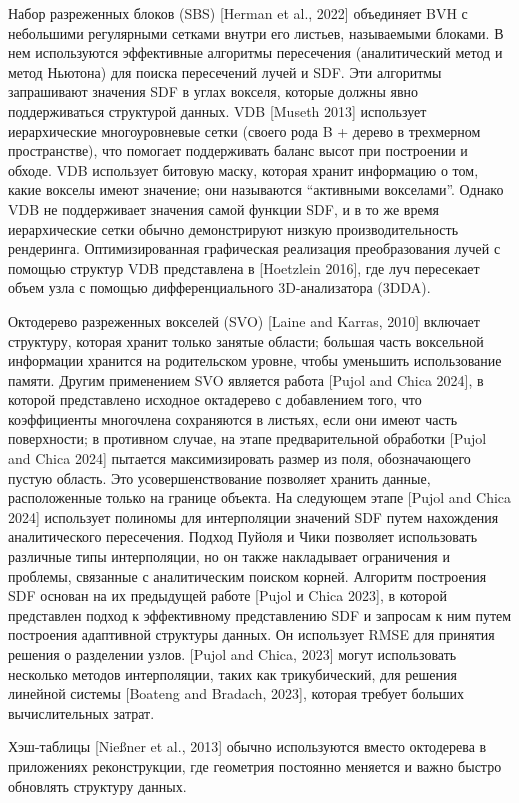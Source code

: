 \documentclass[a4paper,hidelinks,12pt]{article}
\begin{document}
Набор разреженных блоков (SBS) [Herman et al., 2022] объединяет BVH с небольшими регулярными сетками 
внутри его листьев, называемыми блоками. В нем используются эффективные алгоритмы пересечения 
(аналитический метод и метод Ньютона) для поиска пересечений лучей и SDF. Эти алгоритмы запрашивают значения SDF 
в углах вокселя, которые должны явно поддерживаться структурой данных. VDB [Museth 2013] использует иерархические 
многоуровневые сетки (своего рода B + дерево в трехмерном пространстве), что помогает поддерживать баланс высот при построении и 
обходе. VDB использует битовую маску, которая хранит информацию о том, какие вокселы имеют значение; они называются “активными вокселами”. 
Однако VDB не поддерживает значения самой функции SDF, и в то же время иерархические сетки обычно демонстрируют низкую 
производительность рендеринга. Оптимизированная графическая реализация преобразования лучей с помощью структур 
VDB представлена в [Hoetzlein 2016], где луч пересекает объем узла с помощью дифференциального 3D-анализатора (3DDA).

Октодерево разреженных вокселей (SVO) [Laine and Karras, 2010] включает структуру, которая хранит только 
занятые области; большая часть воксельной информации хранится на родительском уровне, чтобы уменьшить 
использование памяти. Другим применением SVO является работа [Pujol and Chica 2024], в которой представлено исходное 
октадерево с добавлением того, что коэффициенты многочлена сохраняются в листьях, если они имеют часть поверхности; 
в противном случае, на этапе предварительной обработки [Pujol and Chica 2024] пытается максимизировать размер из поля, 
обозначающего пустую область. Это усовершенствование позволяет хранить данные, расположенные только на границе объекта. 
На следующем этапе [Pujol and Chica 2024] использует полиномы для интерполяции значений SDF путем нахождения аналитического 
пересечения. Подход Пуйоля и Чики позволяет использовать различные типы интерполяции, но он также накладывает ограничения 
и проблемы, связанные с аналитическим поиском корней. Алгоритм построения SDF основан на их предыдущей работе [Pujol и Chica 2023], 
в которой представлен подход к эффективному представлению SDF и запросам к ним путем построения адаптивной структуры данных. 
Он использует RMSE для принятия решения о разделении узлов. [Pujol and Chica, 2023] могут использовать несколько 
методов интерполяции, таких как трикубический, для решения линейной системы [Boateng and Bradach, 2023], 
которая требует больших вычислительных затрат.

Хэш-таблицы [Nießner et al., 2013] обычно используются вместо октодерева в приложениях 
реконструкции, где геометрия постоянно меняется и важно быстро обновлять структуру данных.
\end{document}
